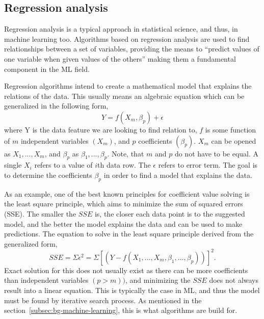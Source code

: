 
\subsection{Regression analysis}\label{subsec:bg-regression-ml}

Regression analysis is a typical approach in statistical science,
and thus, in machine learning too.
Algorithms based on regression analysis
are used to find relationships between a set of variables,
providing the means to \enquote{predict values of one variable
when given values of the others}
making them a fundamental component in the ML field.~\cite{merriam2022regression}

Regression algorithms intend to create a mathematical model
that explains the relations of the data.
This usually means an algebraic equation
which can be generalized in the following form,
\begin{equation}
    \label{eqn:general-regression-model}
    Y = f(X_{m},\beta_{p})+\epsilon
\end{equation}
where Y is the data feature we are looking to find relation to,
$f$ is some function of $m$ independent variables $(X_{m})$,
and $p$ coefficients $(\beta_{p})$.
$X_{m}$ can be opened as $X_{1},...,X_{m}$,
and $\beta_{p}$ as $\beta_{1},...,\beta_{p}$.
Note, that $m$ and $p$ do not have to be equal.
A single $X_{i}$ refers to a value of $i$th data row.
The $\epsilon$ refers to error term.
The goal is to determine the coefficients $\beta_{p}$
in order to find a model that explains the data.~\cite{freund2006regression}

As an example,
one of the best known principles for coefficient value solving
is the least square principle,
which aims to minimize the sum of squared errors (SSE).
The smaller the $SSE$ is,
the closer each data point is to the suggested model,
and the better the model explains the data
and can be used to make predictions.
The equation to solve in the least square principle
derived from the generalized form,
\begin{equation}
    \label{eqn:sum-of-squared-errors}
    SSE = \Sigma\epsilon^{2} = \Sigma[(Y-f(X_{1},...,X_{m},\beta_{1},...,\beta_{p}))]^{2}.
\end{equation}
Exact solution for this does not usually exist
as there can be more coefficients than independent variables $(p>m))$,
and minimizing the $SSE$ does not always result into a linear equation.
This is typically the case in ML,
and thus the model must be found
by iterative search process.
As mentioned in the section~\ref{subsec:bg-machine-learning},
this is what algorithms are build for.

